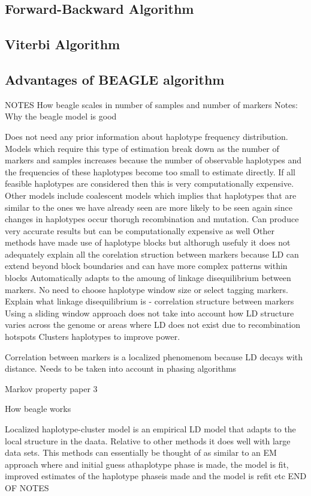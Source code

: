 \documentclass[a4paper,12pt,twoside,abstraction,titlepage]{article}
\begin{document}
\newpage

\subsection{Forward-Backward Algorithm}

\subsection{Viterbi Algorithm}


\subsection{Advantages of BEAGLE algorithm}
NOTES
How beagle scales in number of samples and number of markers
Notes:
Why the beagle model is good

Does not need any prior information about haplotype frequency distribution. Models which require this type of estimation break down as the number of markers and samples increases because the number of observable haplotypes and the frequencies of these haplotypes become too small to estimate directly. If all feasible haplotypes are considered then this is very computationally expensive.
Other models include coalescent models which implies that haplotypes that are similar to the ones we have already seen are more likely to be seen again since changes in haplotypes occur thorugh recombination and mutation. Can produce very accurate results but can be computationally expensive as well
Other methods have made use of haplotype blocks but althorugh usefuly it does not adequately explain all the corelation struction between markers because LD can extend beyond block boundaries and can have more complex patterns within blocks
Automatically adapts to the amoung of linkage disequilibrium between markers.  No need to choose haplotype window size or select tagging markers.
Explain what linkage disequilibrium is - correlation structure between markers
Using a sliding window approach does not take into account how LD structure varies across the genome or areas where LD does not exist due to recombination hotspots 
Clusters haplotypes to improve power.

Correlation between markers is a localized phenomenom because LD decays with distance. Needs to be taken into account in phasing algorithms

Markov property
paper 3


How beagle works

Localized haplotype-cluster model is an empirical LD model that adapts to the local structure in the daata. Relative to other methods it does well with large data sets. This methods can essentially be thought of as similar to an EM approach where and initial guess athaplotype phase is made, the model is fit, improved estimates of the haplotype phaseis made and the model is refit etc
END OF NOTES
\newpage
\end{document}
